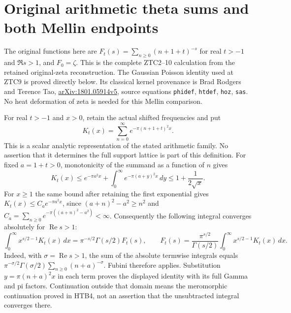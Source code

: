 \documentclass[11pt,a4paper]{article}
\theoremstyle{definition}\newtheorem{definition}[theorem]{Definition}
\begin{document}
\clearpage
\section{Original arithmetic theta sums and both Mellin endpoints}
The original functions here are $F_t(s)=\sum_{n\ge0}(n+1+t)^{-s}$ for real $t>-1$ and $\Re s>1$, and $F_0=\zeta$. This is the complete ZTC2--10 calculation from the retained original-zeta reconstruction. The Gaussian Poisson identity used at ZTC9 is proved directly below. Its classical kernel provenance is Brad Rodgers and Terence Tao, \href{https://arxiv.org/abs/1801.05914v5}{arXiv:1801.05914v5}, source equations \texttt{phidef}, \texttt{htdef}, \texttt{hoz}, \texttt{sas}. No heat deformation of zeta is needed for this Mellin comparison.


For real $t>-1$ and $x>0$, retain the actual shifted frequencies and put
\begin{equation}\tag{ZTC2}
 K_t(x)=\sum_{n=0}^{\infty}
               e^{-\pi(n+1+t)^2x}.
\end{equation}
This is a scalar analytic representation of the stated arithmetic
family. No assertion that it determines the full support lattice is
part of this definition. For fixed $a=1+t>0$, monotonicity of the
summand as a function of $n$ gives
\begin{equation}\tag{ZTC3}
 K_t(x)\le e^{-\pi a^2x}
              +\int_0^\infty e^{-\pi(a+y)^2x}\,dy
 \le 1+\frac1{2\sqrt x}.
\end{equation}
For $x\ge1$ the same bound after retaining the first exponential
gives $K_t(x)\le C_a e^{-\pi a^2x}$, since
$(a+n)^2-a^2\ge n^2$ and
$C_a=\sum_{n\ge0}e^{-\pi((a+n)^2-a^2)}<\infty$.
Consequently the following integral converges absolutely for
$\operatorname{Re}s>1$:
\begin{equation}\tag{ZTC4}
 \int_0^\infty x^{s/2-1}K_t(x)\,dx
   =\pi^{-s/2}\Gamma(s/2)F_t(s),\qquad
 F_t(s)=\frac{\pi^{s/2}}{\Gamma(s/2)}
                \int_0^\infty x^{s/2-1}K_t(x)\,dx.
\end{equation}
Indeed, with $\sigma=\operatorname{Re}s>1$, the sum of the
absolute termwise integrals equals
$\pi^{-\sigma/2}\Gamma(\sigma/2)\sum_{n\ge0}(n+a)^{-\sigma}$.
Fubini therefore applies. Substitution $y=\pi(n+a)^2x$ in each
term proves the displayed identity with its full Gamma and pi factors.
Continuation outside that domain means the meromorphic continuation
proved in HTB4, not an assertion that the unsubtracted integral converges
there.
\end{document}
